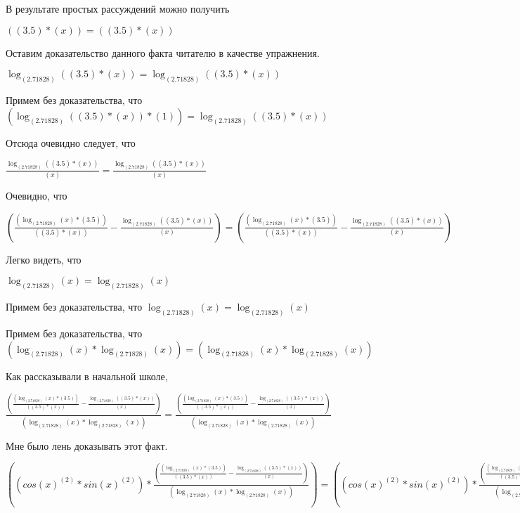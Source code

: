 \documentclass[12pt,a4paper,fleqn]{article}
\theoremstyle{definition}
\begin{document}
В результате простых рассуждений можно получить

$(( 3.5 ) * ( x )) = (( 3.5 ) * ( x ))$

Оставим доказательство данного факта читателю в качестве упражнения.

$\log_{( 2.71828 )}{(( 3.5 ) * ( x ))} = \log_{( 2.71828 )}{(( 3.5 ) * ( x ))}$

Примем без доказательства, что
$(\log_{( 2.71828 )}{(( 3.5 ) * ( x ))} * ( 1 )) = \log_{( 2.71828 )}{(( 3.5 ) * ( x ))}$

Отсюда очевидно следует, что

$\frac{\log_{( 2.71828 )}{(( 3.5 ) * ( x ))}}{( x )}
 = \frac{\log_{( 2.71828 )}{(( 3.5 ) * ( x ))}}{( x )}
$

Очевидно, что

$(\frac{(\log_{( 2.71828 )}{( x )} * ( 3.5 ))}{(( 3.5 ) * ( x ))}
 - \frac{\log_{( 2.71828 )}{(( 3.5 ) * ( x ))}}{( x )}
) = (\frac{(\log_{( 2.71828 )}{( x )} * ( 3.5 ))}{(( 3.5 ) * ( x ))}
 - \frac{\log_{( 2.71828 )}{(( 3.5 ) * ( x ))}}{( x )}
)$

Легко видеть, что

$\log_{( 2.71828 )}{( x )} = \log_{( 2.71828 )}{( x )}$

Примем без доказательства, что
$\log_{( 2.71828 )}{( x )} = \log_{( 2.71828 )}{( x )}$

Примем без доказательства, что
$(\log_{( 2.71828 )}{( x )} * \log_{( 2.71828 )}{( x )}) = (\log_{( 2.71828 )}{( x )} * \log_{( 2.71828 )}{( x )})$

Как рассказывали в начальной школе,

$\frac{(\frac{(\log_{( 2.71828 )}{( x )} * ( 3.5 ))}{(( 3.5 ) * ( x ))}
 - \frac{\log_{( 2.71828 )}{(( 3.5 ) * ( x ))}}{( x )}
)}{(\log_{( 2.71828 )}{( x )} * \log_{( 2.71828 )}{( x )})}
 = \frac{(\frac{(\log_{( 2.71828 )}{( x )} * ( 3.5 ))}{(( 3.5 ) * ( x ))}
 - \frac{\log_{( 2.71828 )}{(( 3.5 ) * ( x ))}}{( x )}
)}{(\log_{( 2.71828 )}{( x )} * \log_{( 2.71828 )}{( x )})}
$

Мне было лень доказывать этот факт.

$((cos{( x )}^{( 2 )} * sin{( x )}^{( 2 )}) * \frac{(\frac{(\log_{( 2.71828 )}{( x )} * ( 3.5 ))}{(( 3.5 ) * ( x ))}
 - \frac{\log_{( 2.71828 )}{(( 3.5 ) * ( x ))}}{( x )}
)}{(\log_{( 2.71828 )}{( x )} * \log_{( 2.71828 )}{( x )})}
) = ((cos{( x )}^{( 2 )} * sin{( x )}^{( 2 )}) * \frac{(\frac{(\log_{( 2.71828 )}{( x )} * ( 3.5 ))}{(( 3.5 ) * ( x ))}
 - \frac{\log_{( 2.71828 )}{(( 3.5 ) * ( x ))}}{( x )}
)}{(\log_{( 2.71828 )}{( x )} * \log_{( 2.71828 )}{( x )})}
)$
\end{document}
